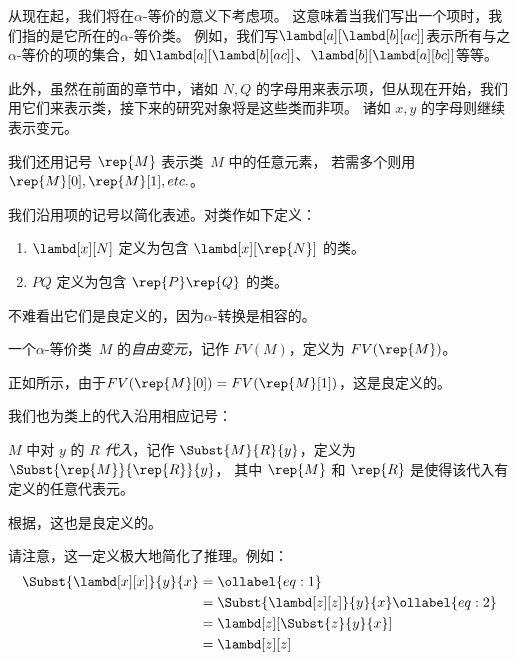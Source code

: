 \documentclass[../../../include/open-logic-section]{subfiles}
\begin{document}

从现在起，我们将在$\alpha$-等价的意义下考虑项。
这意味着当我们写出一个项时，我们指的是它所在的$\alpha$-等价类。
例如，我们写$\lambd[a][\lambd[b][a c]]$表示所有与之$\alpha$-等价的项的集合，如$\lambd[a][\lambd[b][a
    c]]$、$\lambd[b][\lambd[a][b c]]$等等。

此外，虽然在前面的章节中，诸如 $N, Q$ 的字母用来表示项，但从现在开始，我们用它们来表示类，接下来的研究对象将是这些类而非项。
诸如 $x, y$ 的字母则继续表示变元。

我们还用记号 $\rep{M}$ 表示类~$M$ 中的任意元素，
若需多个则用$\rep{M}[0], \rep{M}[1], etc. $。

我们沿用项的记号以简化表述。对类作如下定义：
\begin{defn}
  \begin{enumerate}
  \item $\lambd[x][N]$ 定义为包含 $\lambd[x][\rep{N}]$ 的类。
  \item $PQ$ 定义为包含 $\rep{P}\rep{Q}$ 的类。
  \end{enumerate}
\end{defn}

不难看出它们是良定义的，因为$\alpha$-转换是相容的。

\begin{defn} 
  一个$\alpha$-等价类~$M$ 的\emph{自由变元}，记作 $FV(M)$，定义为 $FV(\rep{M})$。
\end{defn}

正如所示，由于$FV(\rep{M}[0]) =
FV(\rep{M}[1])$，这是良定义的。

我们也为类上的代入沿用相应记号：
\begin{defn} 
  $M$ 中对 $y$ 的 $R$ \emph{代入}，记作 $\Subst{M}{R}{y}$，定义为$\Subst{\rep{M}}{\rep{R}}{y}$，
  其中 $\rep{M}$ 和 $\rep{R}$ 是使得该代入有定义的任意代表元。
\end{defn}

根据，这也是良定义的。

请注意，这一定义极大地简化了推理。例如：
\begin{align}
  \Subst{\lambd[x][x]}{y}{x} & =\ollabel{eq:1}\\
  &= \Subst{\lambd[z][z]}{y}{x} \ollabel{eq:2}\\
  &= \lambd[z][\Subst{z}{y}{x}] \\
  &= \lambd[z][z]
\end{align}
\end{document}
